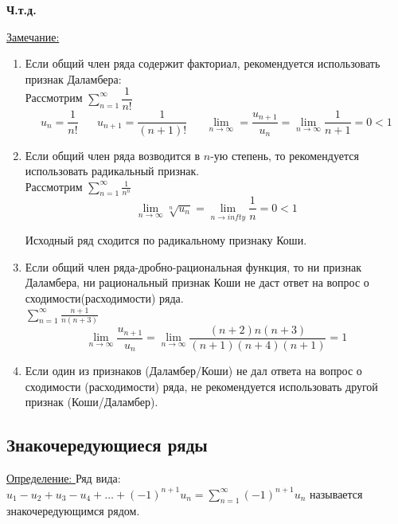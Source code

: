 \documentclass[12pt]{article}
\let\oldsum\sum
\let\oldlim\lim
\renewcommand{\sum}{\oldsum\limits}
\renewcommand{\lim}{\oldlim\limits}
\begin{document}
  \begin{center}
    \textbf{Ч.т.д.}
  \end{center}

  \underline{Замечание:} 
  \begin{enumerate}
    \item Если общий член ряда содержит факториал, рекомендуется использовать признак Даламбера:\\
    Рассмотрим $\sum_{n=1}^{\infty} \dfrac{1}{n!}$
    \[u_n = \frac{1}{n!} \hspace{20pt} u_{n+1}= \frac{1}{(n+1)!} \hspace{20pt} 
    \lim_{n \to \infty} = \frac{u_{n+1}}{u_n}=\lim_{n \to \infty} \frac{1}{n+1} =0 <1\]
    \begin{center}
    \end{center} 

    \item Если общий член ряда возводится в $n$-ую степень, то рекомендуется использовать 
    радикальный признак.\\
    Рассмотрим $\sum_{n=1}^{\infty} \frac{1}{n^n}$
    \[\lim_{n \to \infty} \sqrt[n]{u_n} = \lim_{n \to infty} \frac{1}{n}=0<1 \]
    \begin{center}
      Исходный ряд сходится по радикальному признаку Коши.
    \end{center}

    \pagebreak

    \item Если общий член ряда-дробно-рациональная функция, то ни признак Даламбера, ни 
    рациональный признак Коши не даст ответ на вопрос о сходимости(расходимости) ряда.\\
    $\sum_{n=1}^{\infty} \frac{n+1}{n(n+3)}$
    \[\lim_{n \to \infty} \frac{u_{n+1}}{u_n}=\lim_{n \to \infty}\frac{(n+2)n(n+3)}{(n+1)(n+4)(n+1)}=1\]
    
    \item Если один из признаков (Даламбер/Коши) не дал ответа на вопрос о 
    сходимости (расходимости) ряда, не рекомендуется использовать другой признак (Коши/Даламбер).
  \end{enumerate}

  \subsection{Знакочередующиеся ряды}
  \underline{Определение: } Ряд вида: $u_1-u_2+u_3-u_4+\dots+(-1)^{n+1} u_n =
  \sum_{n=1}^{\infty} (-1)^{n+1} u_n $ называется знакочередующимся рядом.\\
\end{document}
